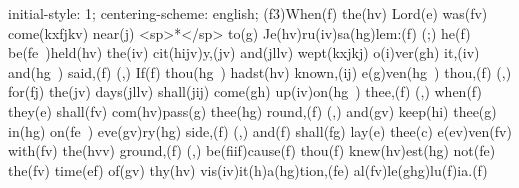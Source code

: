 initial-style: 1;
centering-scheme: english;
(f3)When(f) the(hv) Lord(e) was(fv) come(kxfjkv) near(j) <sp>*</sp> to(g) Je(hv)ru(iv)sa(hg)lem:(f) (;) he(f) be(fe~)held(hv) the(iv) cit(hijv)y,(jv) and(jllv) wept(kxjkj) o(i)ver(gh) it,(iv) and(hg~) said,(f) (,) If(f) thou(hg~) hadst(hv) known,(ij) e(g)ven(hg~) thou,(f) (,) for(fj) the(jv) days(jllv) shall(jij) come(gh) up(iv)on(hg~) thee,(f) (,) when(f) they(e) shall(fv) com(hv)pass(g) thee(hg) round,(f) (,) and(gv) keep(hi) thee(g) in(hg) on(fe~) eve(gv)ry(hg) side,(f) (,) and(f) shall(fg) lay(e) thee(c) e(ev)ven(fv) with(fv) the(hvv) ground,(f) (,) be(fiif)cause(f) thou(f) knew(hv)est(hg) not(fe) the(fv) time(ef) of(gv) thy(hv) vis(iv)it(h)a(hg)tion,(fe) al(fv)le(ghg)lu(f)ia.(f)
